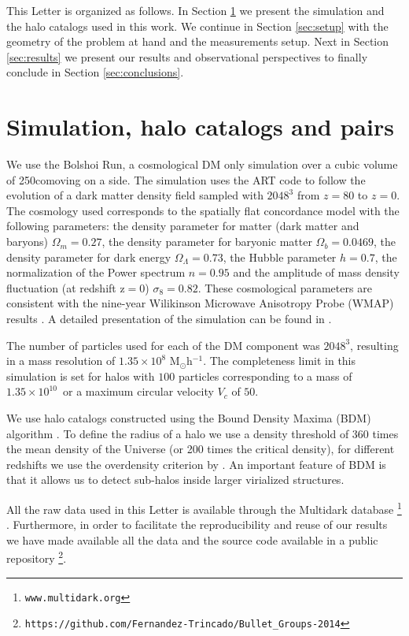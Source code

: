 \documentclass{emulateapj}
\newcommand{\hMpc}{{\ifmmode{h^{-1}{\rm Mpc}}\else{$h^{-1}$Mpc }\fi}}
\newcommand{\hMsun}{{\ifmmode{h^{-1}{\rm {M_{\odot}}}}\else{$h^{-1}{\rm{M_{\odot}}}$}\fi}}
\newcommand{\kms}{{\ifmmode{{\mathrm{\,km\ s}^{-1}}}\else{\,km~s$^{-1}$}\fi}}
\begin{document}
This Letter is organized as follows. In Section
\ref{sec:simulation} we present the simulation and the halo catalogs
used in this work. We continue in Section \ref{sec:setup} with the
geometry of the problem at hand and the measurements setup. Next in
Section \ref{sec:results} we present our results and observational
perspectives to finally conclude in Section \ref{sec:conclusions}. 


\section{Simulation, halo catalogs and pairs}
\label{sec:simulation}

We use the Bolshoi Run, a cosmological DM only simulation over a cubic
volume of 250\hMpc comoving on a side. The simulation uses the ART
code \citep{Kravtsov1997} to follow the evolution of a dark matter
density field sampled with $2048^3$ from $z=80$ to $z=0$. The
cosmology used  corresponds to  the spatially flat concordance model
with the following parameters:  the density parameter for matter (dark
matter and baryons) $\Omega_m=0.27$, the density parameter for baryonic matter
$\Omega_b=0.0469$, the density parameter for dark energy
$\Omega_{\Lambda}=0.73$, the Hubble parameter $h=0.7$, the
normalization of the Power spectrum $n=0.95$ and the amplitude of mass
density fluctuation (at redshift z$=$0) $\sigma_8=0.82$.  These
cosmological parameters are consistent with the nine-year Wilikinson
Microwave Anisotropy Probe (WMAP) results \citep{hinshaw_etal13}. A
detailed presentation of the simulation can be found in
\citet{2011ApJ...740..102K}.     


The number of particles used for each of the DM component was
$2048^3$, resulting in a mass resolution of $1.35 \times 10^8$
M$_{\odot}$h$^{-1}$. The completeness limit in this simulation is set
for halos with $100$ particles corresponding to a mass of
$1.35\times10^{10}$\hMsun\ or a maximum circular velocity $V_{c}$ of
$50$\kms. 

We use halo catalogs constructed using the Bound Density Maxima (BDM)
algorithm \citep{BDM,BDMb}. To define the radius of a halo we use a
density threshold of 360 times the mean density of the Universe (or
200 times the critical density), for different redshifts we use the
overdensity criterion by \cite{Bryan1998}. An important feature of BDM
is that it allows us to detect sub-halos inside larger virialized
structures.  


All the raw data used in this Letter is available through the
Multidark database \footnote{\texttt{www.multidark.org}}
\citep{Riebe2013}.  Furthermore, in order to facilitate the
reproducibility and reuse of our results we have made available all
the data and the source code available in a public
repository \footnote{\texttt{https://github.com/Fernandez-Trincado/Bullet\_Groups-2014}}. 
\end{document}
